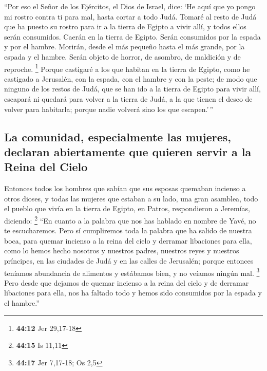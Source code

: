 \begin{paracol}{2}
 ``Por eso el Señor de los Ejércitos, el Dios de Israel,
dice: `He aquí que yo pongo mi rostro contra ti para mal, hasta cortar a
todo Judá.  Tomaré al resto de Judá que ha puesto su
rostro para ir a la tierra de Egipto a vivir allí, y todos ellos serán
consumidos. Caerán en la tierra de Egipto. Serán consumidos por la
espada y por el hambre. Morirán, desde el más pequeño hasta el más
grande, por la espada y el hambre. Serán objeto de horror, de asombro,
de maldición y de reproche. \footnote{\textbf{44:12} Jer 29,17-18}
 Porque castigaré a los que habitan en la tierra de
Egipto, como he castigado a Jerusalén, con la espada, con el hambre y
con la peste;  de modo que ninguno de los restos de Judá,
que se han ido a la tierra de Egipto para vivir allí, escapará ni
quedará para volver a la tierra de Judá, a la que tienen el deseo de
volver para habitarla; porque nadie volverá sino los que escapen.'\,''

\hypertarget{la-comunidad-especialmente-las-mujeres-declaran-abiertamente-que-quieren-servir-a-la-reina-del-cielo}{%
\subsection{La comunidad, especialmente las mujeres, declaran
abiertamente que quieren servir a la Reina del
Cielo}\label{la-comunidad-especialmente-las-mujeres-declaran-abiertamente-que-quieren-servir-a-la-reina-del-cielo}}

 Entonces todos los hombres que sabían que sus esposas
quemaban incienso a otros dioses, y todas las mujeres que estaban a su
lado, una gran asamblea, todo el pueblo que vivía en la tierra de
Egipto, en Patros, respondieron a Jeremías, diciendo: \footnote{\textbf{44:15}
  Is 11,11}  ``En cuanto a la palabra que nos has hablado
en nombre de Yavé, no te escucharemos.  Pero sí
cumpliremos toda la palabra que ha salido de nuestra boca, para quemar
incienso a la reina del cielo y derramar libaciones para ella, como lo
hemos hecho nosotros y nuestros padres, nuestros reyes y nuestros
príncipes, en las ciudades de Judá y en las calles de Jerusalén; porque
entonces teníamos abundancia de alimentos y estábamos bien, y no veíamos
ningún mal. \footnote{\textbf{44:17} Jer 7,17-18; Os 2,5}
 Pero desde que dejamos de quemar incienso a la reina del
cielo y de derramar libaciones para ella, nos ha faltado todo y hemos
sido consumidos por la espada y el hambre.''


\end{paracol}
